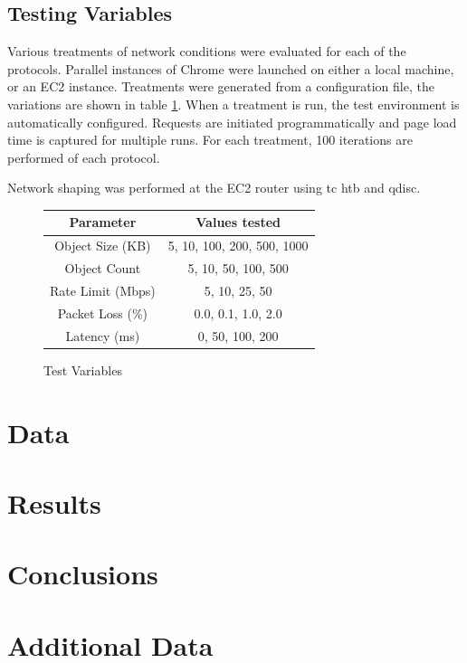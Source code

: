\documentclass[12pt]{article}
\begin{document}
\subsection{Testing Variables}
Various treatments of network conditions were evaluated for each of the protocols. Parallel instances of Chrome were launched on either a local machine, or an EC2 instance. Treatments were generated from a configuration file, the variations are shown in table \ref{test_variables}. When a treatment is run, the test environment is automatically configured. Requests are initiated programmatically and page load time is captured for multiple runs. For each treatment, 100 iterations are performed of each protocol.

Network shaping was performed at the EC2 router using tc htb and qdisc.
\begin{figure}
\centering
\begin{tabular}{c|c}
	Parameter	&	Values tested 	\\\hline
	Object Size (KB)	&	5, 10, 100, 200, 500, 1000	\\
	Object Count &	5, 10, 50, 100, 500	\\
	Rate Limit (Mbps) 	&	5, 10, 25, 50	\\
	Packet Loss (\%)	&	0.0, 0.1, 1.0, 2.0	\\
	Latency (ms)		&	0, 50, 100, 200	\\
\end{tabular}
\caption{Test Variables}
\label{test_variables}
\end{figure}


\section{Data}
\label{data}

\section{Results}
\label{results}

\section{Conclusions}
\label{conclusions}

\appendix
\clearpage
\section{Additional Data}
\end{document}
